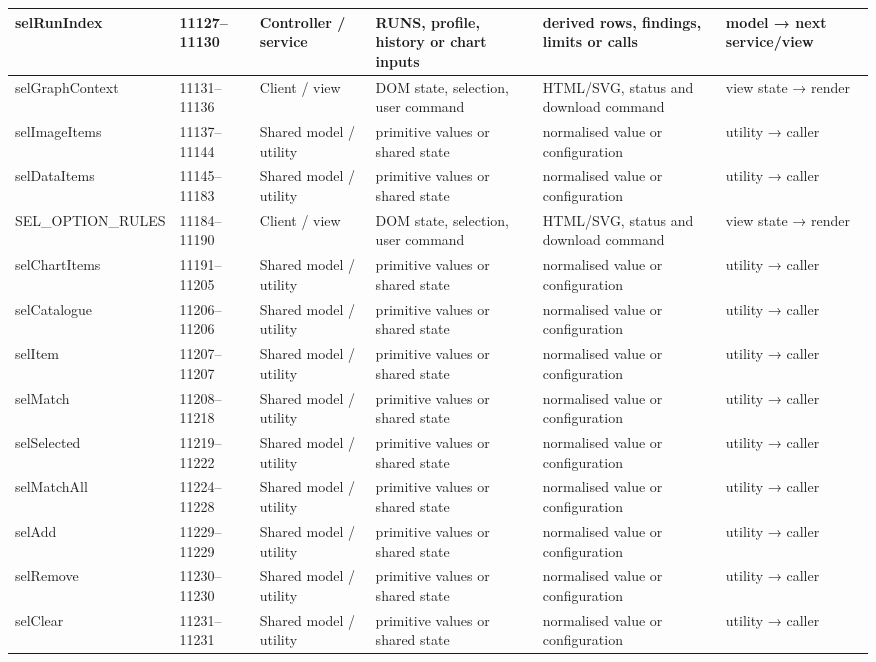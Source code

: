 \begin{landscape}
\begin{longtable}{@{}p{3.2cm}p{1.45cm}p{2.7cm}p{4.0cm}p{4.0cm}p{3.0cm}@{}}
selRunIndex & 11127--11130 & Controller / service & RUNS, profile, history or chart inputs & derived rows, findings, limits or calls & model → next service/view \\\hline
selGraphContext & 11131--11136 & Client / view & DOM state, selection, user command & HTML/SVG, status and download command & view state → render \\\hline
selImageItems & 11137--11144 & Shared model / utility & primitive values or shared state & normalised value or configuration & utility → caller \\\hline
selDataItems & 11145--11183 & Shared model / utility & primitive values or shared state & normalised value or configuration & utility → caller \\\hline
SEL\_OPTION\_RULES & 11184--11190 & Client / view & DOM state, selection, user command & HTML/SVG, status and download command & view state → render \\\hline
selChartItems & 11191--11205 & Shared model / utility & primitive values or shared state & normalised value or configuration & utility → caller \\\hline
selCatalogue & 11206--11206 & Shared model / utility & primitive values or shared state & normalised value or configuration & utility → caller \\\hline
selItem & 11207--11207 & Shared model / utility & primitive values or shared state & normalised value or configuration & utility → caller \\\hline
selMatch & 11208--11218 & Shared model / utility & primitive values or shared state & normalised value or configuration & utility → caller \\\hline
selSelected & 11219--11222 & Shared model / utility & primitive values or shared state & normalised value or configuration & utility → caller \\\hline
selMatchAll & 11224--11228 & Shared model / utility & primitive values or shared state & normalised value or configuration & utility → caller \\\hline
selAdd & 11229--11229 & Shared model / utility & primitive values or shared state & normalised value or configuration & utility → caller \\\hline
selRemove & 11230--11230 & Shared model / utility & primitive values or shared state & normalised value or configuration & utility → caller \\\hline
selClear & 11231--11231 & Shared model / utility & primitive values or shared state & normalised value or configuration & utility → caller \\\hline

\end{longtable}
\end{landscape}
